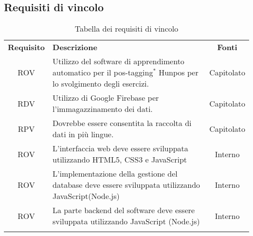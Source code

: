 \subsection{Requisiti di vincolo}
\begin{longtable}{| c | p{10cm} | c |}
		\rowcolor{LightBlue}
		\color{white}\bfseries Requisito & \color{white}\bfseries Descrizione & \color{white}\bfseries Fonti\\[0.25cm]
		ROV & Utilizzo del software di apprendimento automatico per il pos-tagging$^*$ Hunpos per lo svolgimento degli esercizi. & Capitolato \\
		RDV & Utilizzo di Google Firebase per l'immagazzinamento dei dati. & Capitolato \\
		RPV & Dovrebbe essere consentita la raccolta di dati in più lingue. & Capitolato \\
		ROV & L’interfaccia web deve essere sviluppata utilizzando HTML5, CSS3 e JavaScript & Interno\\
		ROV & L'implementazione della gestione del database deve essere sviluppata utilizzando JavaScript(Node.js) & Interno\\
		ROV & La parte backend del software deve essere sviluppata utilizzando JavaScript (Node.js) & Interno\\
		\hline
		\caption{Tabella dei requisiti di vincolo}
\end{longtable}

